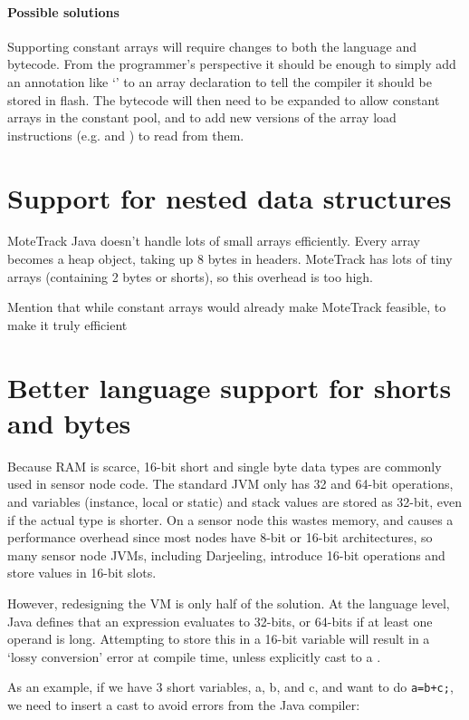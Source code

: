 \paragraph{Possible solutions}
Supporting constant arrays will require changes to both the language and bytecode. From the programmer's perspective it should be enough to simply add an annotation like `' to an array declaration to tell the compiler it should be stored in flash. The bytecode will then need to be expanded to allow constant arrays in the constant pool, and to add new versions of the array load instructions (e.g.  and ) to read from them.




\section{Support for nested data structures}
\label{sec-nested-data}
MoteTrack Java doesn't handle lots of small arrays efficiently. Every array becomes a heap object, taking up 8 bytes in headers. MoteTrack has lots of tiny arrays (containing 2 bytes or shorts), so this overhead is too high.

Mention that while constant arrays would already make MoteTrack feasible, to make it truly efficient


\section{Better language support for shorts and bytes}
\label{sec-small-datatypes}
Because RAM is scarce, 16-bit short and single byte data types are commonly used in sensor node code. The standard JVM only has 32 and 64-bit operations, and variables (instance, local or static) and stack values are stored as 32-bit, even if the actual type is shorter. On a sensor node this wastes memory, and causes a performance overhead since most nodes have 8-bit or 16-bit architectures, so many sensor node JVMs, including Darjeeling, introduce 16-bit operations and store values in 16-bit slots.

However, redesigning the VM is only half of the solution. At the language level, Java defines that an expression evaluates to 32-bits, or 64-bits if at least one operand is long. Attempting to store this in a 16-bit variable will result in a `lossy conversion' error at compile time, unless explicitly cast to a .

As an example, if we have 3 short variables, a, b, and c, and want to do 
\texttt{a=b+c;}, we need to insert a cast to avoid errors from the Java compiler:

